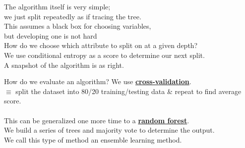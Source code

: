 \documentclass[../../lecture_notes.tex]{subfiles}
\begin{document}
\begin{minipage}{0.6\linewidth}
The algorithm itself is very simple; \\we just split repeatedly as if tracing the tree.\\
This assumes a black box for choosing variables, \\but developing one is not hard\\
How do we choose which attribute to split on at a given depth?\\
We use conditional entropy as a score to determine our next split.\\
A snapshot of the algorithm is as right.
\end{minipage}%
\begin{minipage}{0.4\linewidth}\end{minipage}

\noindent How do we evaluate an algorithm? We use \textbf{\underline{cross-validation}}.\\
	\indent $\equiv$ split the dataset into 80/20 training/testing data \& repeat to find average score.\\
\\
This can be generalized one more time to a \textbf{\underline{random forest}}.\\
\indent We build a series of trees and majority vote to determine the output.\\
We call this type of method an ensemble learning method.\\
\end{document}
